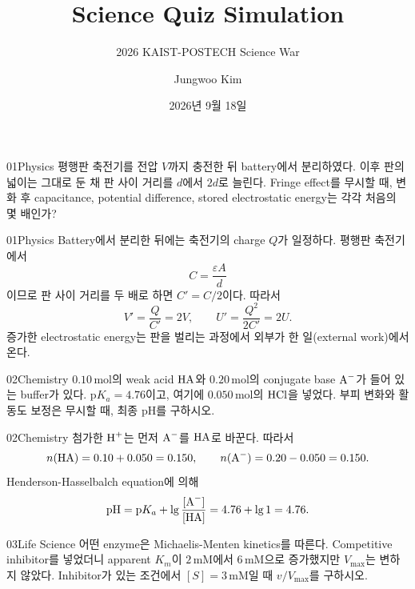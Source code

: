 \documentclass[12pt,aspectratio=169]{beamer}
\title[Science Quiz Simulation]{Science Quiz Simulation}
\subtitle{2026 KAIST-POSTECH Science War}
\author{Jungwoo Kim}
\institute{POSTECH}
\date{2026년 9월 18일}
\begin{document}
\begin{frame}
  \titlepage
\end{frame}
\addtocounter{framenumber}{1}

\begin{problemframe}{01}{Physics}
평행판 축전기를 전압 $V$까지 충전한 뒤 battery에서 분리하였다. 이후 판의 넓이는 그대로 둔 채 판 사이 거리를 $d$에서 $2d$로 늘린다. Fringe effect를 무시할 때, 변화 후 capacitance, potential difference, stored electrostatic energy는 각각 처음의 몇 배인가?
\end{problemframe}

\begin{solutionframe}{01}{Physics}
Battery에서 분리한 뒤에는 축전기의 charge $Q$가 일정하다. 평행판 축전기에서
\[
C=\frac{\varepsilon A}{d}
\]
이므로 판 사이 거리를 두 배로 하면 $C'=C/2$이다. 따라서
\[
V'=\frac{Q}{C'}=2V,
\qquad
U'=\frac{Q^2}{2C'}=2U.
\]
증가한 electrostatic energy는 판을 벌리는 과정에서 외부가 한 일(external work)에서 온다.
\end{solutionframe}

\begin{problemframe}{02}{Chemistry}
$0.10\,\mathrm{mol}$의 weak acid $\ce{HA}$와 $0.20\,\mathrm{mol}$의 conjugate base $\ce{A^-}$가 들어 있는 buffer가 있다. $\mathrm pK_a=4.76$이고, 여기에 $0.050\,\mathrm{mol}$의 $\ce{HCl}$을 넣었다. 부피 변화와 활동도 보정은 무시할 때, 최종 $\mathrm{pH}$를 구하시오.
\end{problemframe}

\begin{solutionframe}{02}{Chemistry}
첨가한 $\ce{H+}$는 먼저 $\ce{A^-}$를 $\ce{HA}$로 바꾼다. 따라서
\[
 n(\ce{HA})=0.10+0.050=0.150,
 \qquad
 n(\ce{A^-})=0.20-0.050=0.150.
\]
Henderson-Hasselbalch equation에 의해
\[
\mathrm{pH}=\mathrm pK_a+\lg\frac{[\ce{A^-}]}{[\ce{HA}]}
=4.76+\lg 1=4.76.
\]
\end{solutionframe}

\begin{problemframe}{03}{Life Science}
어떤 enzyme은 Michaelis-Menten kinetics를 따른다. Competitive inhibitor를 넣었더니 apparent $K_m$이 $2\,\mathrm{mM}$에서 $6\,\mathrm{mM}$으로 증가했지만 $V_{\max}$는 변하지 않았다. Inhibitor가 있는 조건에서 $[S]=3\,\mathrm{mM}$일 때 $v/V_{\max}$를 구하시오.
\end{problemframe}
\end{document}
